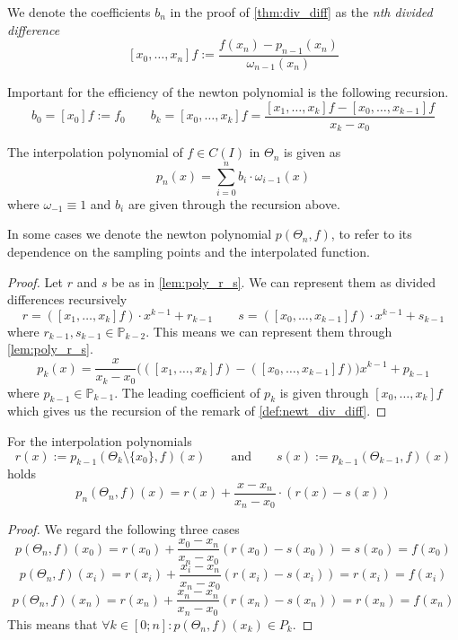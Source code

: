 \begin{definition}\label{def:newt_div_diff}
   We denote the coefficients \(b_n\) in the proof of \cref{thm:div_diff} as the \emph{nth divided difference}
   \[[x_0, \ldots, x_n]f := \frac{f(x_n) - p_{n-1}(x_n)}{\omega_{n-1}(x_n)}\]
\end{definition}
\begin{remark}
   Important for the efficiency of the newton polynomial is the following recursion.
   \[b_0 = [x_0]f := f_0 \qquad b_k = [x_0, \ldots, x_k]f = \frac{[x_1, \ldots, x_k]f - [x_0, \ldots, x_{k-1}]f}{x_k - x_0}\]
\end{remark}

\begin{theorem}
   The interpolation polynomial of \(f \in C(I)\) in \(\Theta_n\) is given as
   \[p_n(x) = \sum_{i=0}^n b_i \cdot \omega_{i-1}(x)\]
   where \(\omega_{-1} \equiv 1\) and \(b_i\) are given through the recursion above.
\end{theorem}
\begin{remark}
   In some cases we denote the newton polynomial \(p(\Theta_n, f)\), to refer to its dependence on the sampling points and the interpolated function.
\end{remark}
\begin{proof}
   Let \(r\) and \(s\) be as in \cref{lem:poly_r_s}.
   We can represent them as divided differences recursively
   \[r = ([x_1, \ldots, x_k]f) \cdot x^{k-1} + r_{k-1} \qquad s = ([x_0, \ldots, x_{k-1}]f) \cdot x^{k-1} + s_{k-1}\]
   where \(r_{k-1}, s_{k-1} \in \mathbb{P}_{k-2}\).
   This means we can represent them through \ref{lem:poly_r_s}.
   \[p_k(x) = \frac{x}{x_k - x_0}\big(([x_1, \ldots, x_k]f) - ([x_0, \ldots, x_{k-1}]f)\big) x^{k-1} + p_{k-1}\]
   where \(p_{k-1} \in \mathbb{P}_{k-1}\).
   The leading coefficient of \(p_k\) is given through \([x_0, \ldots, x_k]f\) which gives us the recursion of the remark of \cref{def:newt_div_diff}.
\end{proof}

\begin{lemma}\label{lem:poly_r_s}
   For the interpolation polynomials
   \[r(x) := p_{k-1}(\Theta_k \setminus \{x_0\}, f)(x) \qquad\text{and}\qquad s(x) := p_{k-1}(\Theta_{k-1}, f)(x)\]
   holds
   \[p_n(\Theta_n, f)(x) = r(x) + \frac{x - x_n}{x_n - x_0} \cdot (r(x) - s(x))\]
\end{lemma}
\begin{proof}
   We regard the following three cases
   \[p(\Theta_n, f)(x_0) = r(x_0) + \frac{x_0 - x_n}{x_n - x_0} (r(x_0) - s(x_0)) = s(x_0) = f(x_0)\]
   \[p(\Theta_n, f)(x_i) = r(x_i) + \frac{x_i - x_n}{x_n - x_0} (r(x_i) - s(x_i)) = r(x_i) = f(x_i)\]
   \[p(\Theta_n, f)(x_n) = r(x_n) + \frac{x_n - x_n}{x_n - x_0} (r(x_n) - s(x_n)) = r(x_n) = f(x_n)\]
   This means that \(\forall k \in [0; n]: p(\Theta_n, f)(x_k) \in P_k\).
\end{proof}

